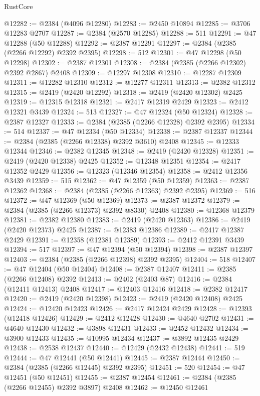 \begin{lexlean}{RustCore}
\begin{coremodule}
@12282 := @2384 (@4096 @12280)
@12283 := @2450 @10894
@12285 := @3706 @12283 @2707
@12287 := @2384 (@2570 @12285)
@12288 := 511
@12291 := @47 @12288 (@50 @12288)
@12292 := @2387 @12291
@12297 := @2384 (@2385 (@2266 @12292) @2392 @2395)
@12298 := 512
@12301 := @47 @12298 (@50 @12298)
@12302 := @2387 @12301
@12308 := @2384 (@2385 (@2266 @12302) @2392 @2867) @2408
@12309 := @12297 @12308
@12310 := @12287 @12309
@12311 := @12282 @12310
@12312 := @12277 @12311
@12313 := @2382 @12312
@12315 := @2419 (@2420 @12292)
@12318 := @2419 (@2420 @12302) @2425
@12319 := @12315 @12318
@12321 := @2417 @12319 @2429
@12323 := @2412 @12321 @3439
@12324 := 513
@12327 := @47 @12324 (@50 @12324)
@12328 := @2387 @12327
@12333 := @2384 (@2385 (@2266 @12328) @2392 @2395)
@12334 := 514
@12337 := @47 @12334 (@50 @12334)
@12338 := @2387 @12337
@12344 := @2384 (@2385 (@2266 @12338) @2392 @3610) @2408
@12345 := @12333 @12344
@12346 := @2382 @12345
@12348 := @2419 (@2420 @12328)
@12351 := @2419 (@2420 @12338) @2425
@12352 := @12348 @12351
@12354 := @2417 @12352 @2429
@12356 := @12323 (@12346 @12354)
@12358 := @2412 @12356 @3439
@12359 := 515
@12362 := @47 @12359 (@50 @12359)
@12363 := @2387 @12362
@12368 := @2384 (@2385 (@2266 @12363) @2392 @2395)
@12369 := 516
@12372 := @47 @12369 (@50 @12369)
@12373 := @2387 @12372
@12379 := @2384 (@2385 (@2266 @12373) @2392 @8330) @2408
@12380 := @12368 @12379
@12381 := @2382 @12380
@12383 := @2419 (@2420 @12363)
@12386 := @2419 (@2420 @12373) @2425
@12387 := @12383 @12386
@12389 := @2417 @12387 @2429
@12391 := @12358 (@12381 @12389)
@12393 := @2412 @12391 @3439
@12394 := 517
@12397 := @47 @12394 (@50 @12394)
@12398 := @2387 @12397
@12403 := @2384 (@2385 (@2266 @12398) @2392 @2395)
@12404 := 518
@12407 := @47 @12404 (@50 @12404)
@12408 := @2387 @12407
@12411 := @2385 (@2266 @12408) @2392
@12413 := @2402 (@2403 @87)
@12416 := @2384 (@12411 @12413) @2408
@12417 := @12403 @12416
@12418 := @2382 @12417
@12420 := @2419 (@2420 @12398)
@12423 := @2419 (@2420 @12408) @2425
@12424 := @12420 @12423
@12426 := @2417 @12424 @2429
@12428 := @12393 (@12418 @12426)
@12429 := @2412 @12428
@12430 := @4640 @2702
@12431 := @4640 @12430
@12432 := @3898 @12431
@12433 := @2452 @12432
@12434 := @3900 @12433
@12435 := @10995 @12434
@12437 := @3892 @12435 @2429
@12438 := @2538 @12437
@12440 := @12429 (@2432 @12438)
@12441 := 519
@12444 := @47 @12441 (@50 @12441)
@12445 := @2387 @12444
@12450 := @2384 (@2385 (@2266 @12445) @2392 @2395)
@12451 := 520
@12454 := @47 @12451 (@50 @12451)
@12455 := @2387 @12454
@12461 := @2384 (@2385 (@2266 @12455) @2392 @3897) @2408
@12462 := @12450 @12461

\end{coremodule}
\end{lexlean}

